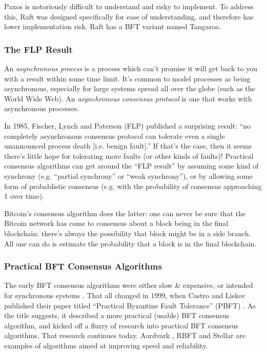 Paxos is notoriously difficult to understand and risky to implement.
To address this, Raft \cite{ongaro2014raft} was designed specifically for ease of understanding, and therefore has lower implementation risk.
Raft has a BFT variant named Tangaroa. \cite{copeland2014tangaroa}

\subsubsection{The FLP Result}
An \emph{asynchronous process} is a process which can't promise it will get back to you with a result within some time limit. It's common to model processes as being asynchronous, especially for large systems spread all over the globe (such as the World Wide Web). An \emph{asynchronous consensus protocol} is one that works with asynchronous processes.

In 1985, Fischer, Lynch and Paterson (FLP) published a surprising result: ``no completely asynchronous consensus protocol can tolerate even a single unannounced process death [i.e. benign fault].'' \cite{fischer1985impossibility} If that's the case, then it seems there's little hope for tolerating more faults (or other kinds of faults)! Practical consensus algorithms can get around the ``FLP result'' by assuming some kind of synchrony (e.g. ``partial synchrony'' or ``weak synchrony''), or by allowing some form of probablistic consensus (e.g. with the probability of consensus approaching 1 over time).

Bitcoin's consensus algorithm does the latter: one can never be sure that the Bitcoin network has come to consensus about a block being in the final blockchain: there's always the possibility that block might be in a side branch. All one can do is estimate the probability that a block is in the final blockchain.

\subsubsection{Practical BFT Consensus Algorithms}
The early BFT consensus algorithms were either slow \& expensive, or intended for synchronous systems \cite{wiki_byzantine,paulitsch2005coverage,hopkins1987evolution,driscoll1983multi}. That all changed in 1999, when Castro and Liskov published their paper titled ``Practical Byzantine Fault Tolerance'' (PBFT) \cite{castro1999practical,castro2001byzantine}. As the title suggests, it described a more practical (usable) BFT consensus algorithm, and kicked off a flurry of research into practical BFT consensus algorithms.
That research continues today. Aardvark \cite{clement2009making}, RBFT \cite{aublin2013rbft} and Stellar \cite{mazieres2015stellar} are examples of algorithms aimed at improving speed and reliability.


